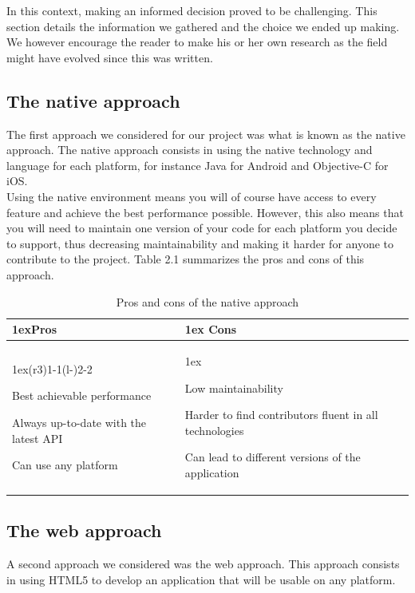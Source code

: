 \documentclass{eplmastersthesis}
\begin{document}
 In this context, making an informed decision proved to be challenging. This section details the information we gathered and the choice we ended up making. We however encourage the reader to make his or her own research as the field might have evolved since this was written.

\subsection{The native approach}

The first approach we considered for our project was what is known as the native approach. The native approach consists in using the native technology and language for each platform, for instance Java for Android and Objective-C for iOS. \\

Using the native environment means you will of course have access to every feature and achieve the best performance possible. However, this also means that you will need to maintain one version of your code for each platform you decide to support, thus decreasing maintainability and making it harder for anyone to contribute to the project. Table 2.1 summarizes the pros and cons of this approach.

\begin{table}[H]
\begin{tabularx}{\linewidth}{>{\parskip1ex}X@{\kern4\tabcolsep}>{\parskip1ex}X}
\toprule
\hfil\bfseries Pros
&
\hfil\bfseries Cons
\\\cmidrule(r{3\tabcolsep}){1-1}\cmidrule(l{-\tabcolsep}){2-2}

Best achievable performance\par
Always up-to-date with the latest API\par
Can use any platform\par

&

Low maintainability\par
Harder to find contributors fluent in all technologies\par
Can lead to different versions of the application\par


\\\bottomrule
\end{tabularx}
\caption{Pros and cons of the native approach}
\end{table}

\subsection{The web approach}
A second approach we considered was the web approach. This approach consists in using HTML5 to develop an application that will be usable on any platform. \\
\end{document}
